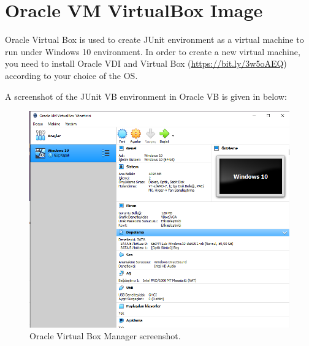 \chapter{Oracle VM VirtualBox Image}
Oracle Virtual Box is used to create JUnit environment as a virtual machine to run under Windows 10 environment.  In order to create a new virtual machine, you need to install Oracle VDI and Virtual Box (\url{https://bit.ly/3w5oAEQ}) according to your choice of the OS.

A screenshot of the JUnit VB environment in Oracle VB is given in  below:
\begin{figure}[!ht]
    \includegraphics{images/oracleVB.png}
    \caption{Oracle Virtual Box Manager screenshot.}
\end{figure}